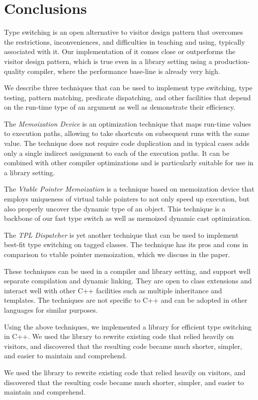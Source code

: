 \documentclass[preprint]{sigplanconf}
\begin{document}
\section{Conclusions} %
\label{sec:cc}

Type switching is an open alternative to visitor design pattern that overcomes 
the restrictions, inconveniences, and difficulties in teaching and using, 
typically associated with it. Our implementation of it comes close or 
outperforms the visitor design pattern, which is true even in a library setting 
using a production-quality compiler, where the performance base-line is 
already very high.

We describe three techniques that can be used to implement type switching, type 
testing, pattern matching, predicate dispatching, and other facilities that 
depend on the run-time type of an argument as well as demonstrate their efficiency.

The \emph{Memoization Device} is an optimization technique that maps run-time values 
to execution paths, allowing to take shortcuts on subsequent runs with the same 
value. The technique does not require code duplication and in typical cases adds 
only a single indirect assignment to each of the execution paths. It can be 
combined with other compiler optimizations and is particularly suitable for use 
in a library setting.

The \emph{Vtable Pointer Memoization} is a technique based on memoization device that 
employs uniqueness of virtual table pointers to not only speed up execution, but 
also properly uncover the dynamic type of an object. This technique is a 
backbone of our fast type switch as well as memoized dynamic cast optimization.

The \emph{TPL Dispatcher} is yet another technique that can be used to 
implement best-fit type switching on tagged classes. The technique has its pros 
and cons in comparison to vtable pointer memoization, which we discuss in the paper.

These techniques can be used in a compiler and library setting, and support well 
separate compilation and dynamic linking. They are open to class extensions and 
interact well with other C++ facilities such as multiple inheritance and 
templates. The techniques are not specific to C++ and can be adopted in other 
languages for similar purposes.

Using the above techniques, we implemented a library for efficient type switching 
in C++. We used the library to rewrite existing code that relied heavily on 
visitors, and discovered that the resulting code became much shorter, simpler, 
and easier to maintain and comprehend.

We used the library to rewrite existing code that relied heavily on 
visitors, and discovered that the resulting code became much shorter, simpler, and easier 
to maintain and comprehend.



\end{document}
